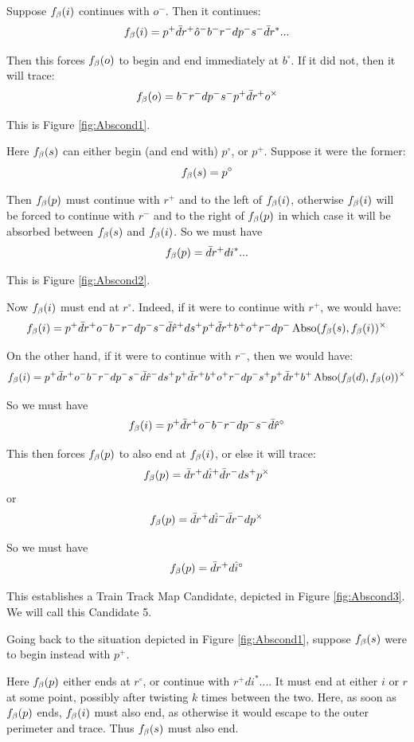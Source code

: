 \label{Abscond}
Suppose $f_\beta(i)$ continues with $o^-$. Then it continues:
\[
f_\beta(i) = p^+ \bar{d} r^+ \hat{o}^- b^- r^- d p^- s^- \bar{d} r^*...
\]

Then this forces $f_\beta(o)$ to begin and end immediately at $b^\circ$. If it did not, then it will trace:
\[
f_\beta(o) = b^- r^- d p^- s^- p^+ \bar{d} r^+ o^\times
\]

This is Figure \ref{fig:Abscond1}.

Here $f_\beta(s)$ can either begin (and end with) $p^\circ$, or $p^+$. Suppose it were the former:
\[
f_\beta(s) = p^\circ
\]

Then $f_\beta(p)$ must continue with $r^+$ and to the left of $f_\beta(i)$, otherwise $f_\beta(i)$ will be forced to continue with $r^-$ and to the right of $f_\beta(p)$ in which case it will be absorbed between $f_\beta(s)$ and $f_\beta(i)$. So we must have
\[
f_\beta(p) = \bar{d} r^+ d i^*...
\]

This is Figure \ref{fig:Abscond2}.

Now $f_\beta(i)$ must end at $r^\circ$. Indeed, if it were to continue with $r^+$, we would have:
\[
f_\beta(i) = p^+ \bar{d} r^+ o^- b^- r^- d p^- s^- \bar{d} \hat{r}^+ d s^+ p^+ \bar{d} r^+ b^+ o^+ r^- d p^- \operatorname{Abso}(f_\beta(s), f_\beta(i))^\times
\]

On the other hand, if it were to continue with $r^-$, then we would have:
\[
f_\beta(i) = p^+ \bar{d} r^+ o^- b^- r^- d p^- s^- \bar{d} \hat{r}^- d s^+ p^+ \bar{d} r^+ b^+ o^+ r^- d p^- s^+ p^+\bar{d} r^+ b^+ \operatorname{Abso}(f_\beta(d), f_\beta(o))^\times
\]

So we must have
\[
f_\beta(i) = p^+ \bar{d} r^+ o^- b^- r^- d p^- s^- \bar{d} \hat{r}^\circ
\]

This then forces $f_\beta(p)$ to also end at $f_\beta(i)$, or else it will trace:
\[
f_\beta(p) = \bar{d} r^+ d \hat{i}^+ \bar{d} r^- d s^+ p^\times
\]
or
\[
f_\beta(p) = \bar{d} r^+ d \hat{i}^- \bar{d} r^- d p^\times
\]

So we must have
\[
f_\beta(p) = \bar{d} r^+ d \hat{i}^\circ
\]

This establishes a Train Track Map Candidate, depicted in Figure \ref{fig:Abscond3}. We will call this Candidate 5.

Going back to the situation depicted in Figure \ref{fig:Abscond1}, suppose $f_\beta(s)$ were to begin instead with $p^+$.

Here $f_\beta(p)$ either ends at $r^\circ$, or continue with $r^+d i^*...$. It must end at either $i$ or $r$ at some point, possibly after twisting $k$ times between the two. Here, as soon as $f_\beta(p)$ ends, $f_\beta(i)$ must also end, as otherwise it would escape to the outer perimeter and trace. Thus $f_\beta(s)$ must also end.


